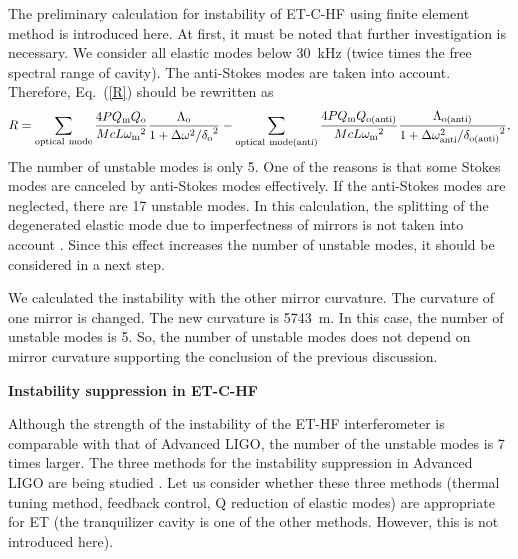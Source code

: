 The preliminary calculation for instability of ET-C-HF using finite element method 
is introduced here. At first, it must be noted that 
further investigation is necessary.
We consider all elastic modes below 30~kHz (twice times the free spectral range of cavity). The anti-Stokes modes are 
taken into account. Therefore, Eq.~(\ref{R}) should be rewritten as \cite{Kells2002}
\begin{equation}
R = \sum_{\rm optical\ mode} \frac{4PQ_{\rm m}Q_{\rm
o}}{McL{\omega_{\rm m}}^2} \frac{\Lambda_{\rm o}}{1+\Delta
\omega^2/{\delta_{\rm o}}^2}-\sum_{\rm optical\ mode(anti)} \frac{4PQ_{\rm m}Q_{\rm
{o(anti)}}}{McL{\omega_{\rm m}}^2} \frac{\Lambda_{\rm o(anti)}}{1+\Delta
\omega_{\rm anti}^2/{\delta_{\rm o(anti)}}^2}, \label{R_antiStokes}
\end{equation}
The number of unstable modes is only 5. One of the reasons is that some Stokes modes are canceled by 
anti-Stokes modes effectively. If the anti-Stokes modes are neglected, there are 17 unstable modes. 
In this calculation, the splitting of the degenerated elastic mode due to imperfectness of mirrors 
is not taken into account \cite{Strigin2008a,Strigin2008b}. 
Since this effect increases the number of unstable modes, it should be considered in a next step. 

We calculated the instability with the other mirror curvature. 
The curvature of one mirror is changed. The new curvature is 5743~m.
In this case, the number of unstable modes is 5. 
So, the number of unstable modes does not depend on mirror curvature 
supporting the conclusion of the previous discussion.


\textbf{Instability suppression in ET-C-HF}
\nopagebreak

Although the strength of the instability of the ET-HF interferometer
is comparable with that of Advanced LIGO, the number of
the unstable modes is 7 times larger. The three methods for the
instability suppression in Advanced LIGO are being studied
\cite{Ju2006b,Gras2006,Ju2009}. Let us consider whether these three
methods (thermal tuning method, feedback control, Q reduction of
elastic modes) are appropriate for ET (the tranquilizer cavity
\cite{Braginsky2002} is one of the other methods. However, this
is not introduced here).

